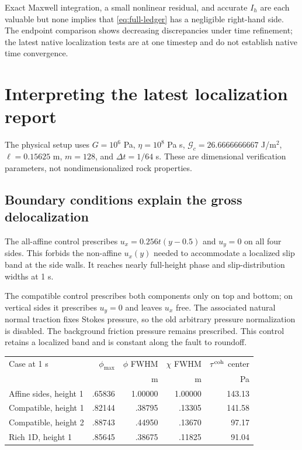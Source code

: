 \documentclass[11pt,a4paper]{article}
\newcommand{\qcoh}{\tau^{\rm coh}}
\newcommand{\Gc}{\mathcal G_c}
\begin{document}
Exact Maxwell integration, a small nonlinear residual, and accurate $I_h$
are each valuable but none implies that \cref{eq:full-ledger} has a negligible
right-hand side. The endpoint comparison shows decreasing discrepancies under
time refinement; the latest native localization tests are at one timestep and
do not establish native time convergence.

\section{Interpreting the latest localization report}
\label{sec:report}

The physical setup uses $G=10^6$ Pa, $\eta=10^8$ Pa s, $\Gc=26.6666666667$
J/m$^2$, $\ell=0.15625$ m, $m=128$, and $\Delta t=1/64$ s. These are dimensional
verification parameters, not nondimensionalized rock properties.

\subsection{Boundary conditions explain the gross delocalization}

The all-affine control prescribes $u_x=0.256t(y-0.5)$ and $u_y=0$ on all
four sides. This forbids the non-affine $u_x(y)$ needed to accommodate a
localized slip band at the side walls. It reaches nearly full-height phase
and slip-distribution widths at 1 s.

The compatible control prescribes both components only on top and bottom;
on vertical sides it prescribes $u_y=0$ and leaves $u_x$ free. The associated
natural normal traction fixes Stokes pressure, so the old arbitrary pressure
normalization is disabled. The background friction pressure remains prescribed.
This control retains a localized band and is constant along the fault to roundoff.

\begin{center}\small
\begin{tabular}{L{.30\textwidth}rrrr}
\toprule
Case at 1 s & $\phi_{\max}$ & $\phi$ FWHM & $\chi$ FWHM & $\qcoh$ center\\
 & & m & m & Pa\\\midrule
Affine sides, height 1 & .65836 & 1.00000 & 1.00000 & 143.13\\
Compatible, height 1 & .82144 & .38795 & .13305 & 141.58\\
Compatible, height 2 & .88743 & .44950 & .13670 & 97.17\\
Rich 1D, height 1 & .85645 & .38675 & .11825 & 91.04\\
\bottomrule
\end{tabular}\end{center}
\end{document}
